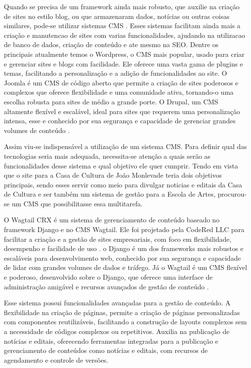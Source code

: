 Quando se precisa de um framework ainda mais robusto, que auxilie na criação de sites no estilo blog, ou que armazenaram dados, notícias ou outras coisas similares, pode-se utilizar sistemas \ac{CMS} \cite{Baker2013}. Esses sistemas facilitam ainda mais a criação e manutencao de sites com varias funcionalidades, ajudando na utilizacao de banco de dados, criação de conteúdo e ate mesmo na \ac{SEO}. Dentre os principais atualmente temos o Wordpress, o \ac{CMS} mais popular, usado para criar e gerenciar sites e blogs com facilidade. Ele oferece uma vasta gama de plugins e temas, facilitando a personalização e a adição de funcionalidades ao site. O Joomla é um \ac{CMS} de código aberto que permite a criação de sites poderosos e complexos que oferece flexibilidade e uma comunidade ativa, tornando-o uma escolha robusta para sites de médio a grande porte. O Drupal, um \ac{CMS} altamente flexível e escalável, ideal para sites que requerem uma personalização intensa, esse e conhecido por sua segurança e capacidade de gerenciar grandes volumes de conteúdo \cite{canavan2011cms}.

Assim viu-se indispensável a utilização de um sistema \ac{CMS}. Para definir qual das tecnologias seria mais adequada, necessita-se atenção a quais serão as funcionalidades desse sistema e qual objetivo ele quer cumprir. Tendo em vista que o site para a Casa de Cultura de João Monlevade teria dois objetivos principais, sendo esses servir como meio para divulgar noticias e editais da Casa de Cultura e ser também um sistema de gestão para a Escola de Artes, procurou-se um \ac{CMS} que possibilitasse essa multitarefa.

O Wagtail CRX é um sistema de gerenciamento de conteúdo baseado no framework Django e no \ac{CMS} Wagtail. Ele foi projetado pela CodeRed LLC para facilitar a criação e a gestão de sites empresariais, com foco em flexibilidade, desempenho e facilidade de uso \cite{WagtailCRX}. o Django é um dos frameworks mais robustos e escaláveis para desenvolvimento web, conhecido por sua segurança e capacidade de lidar com grandes volumes de dados e tráfego. Já o Wagtail é um \ac{CMS} flexível e poderoso, desenvolvido sobre o Django, que oferece uma interface de administração amigável e recursos avançados de gestão de conteúdo \cite{Wagtail}.

Esse sistema possui funcionalidades avançadas para a gestão de conteúdo. A flexibilidade na criação de páginas, permite a criação de páginas personalizadas com componentes reutilizáveis, facilitando a construção de layouts complexos sem a necessidade de códigos complexos ou repetitivos. Auxilia na publicação de notícias e editais, oferecendo ferramentas integradas para a publicação e gerenciamento de conteúdos como notícias e editais, com recursos de agendamento e controle de versões.

